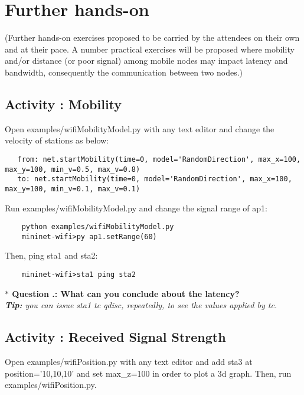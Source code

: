 \section{Further hands-on}
(Further hands-on exercises proposed to be carried by the attendees on their own and at their pace.
	A number practical exercises will be proposed where mobility and/or distance (or poor signal) among mobile nodes may impact latency and bandwidth, consequently the communication between two nodes.)


\setcounter{question}{1}
\subsection{Activity \themycounter{}: Mobility}  


\noindent Open examples/wifiMobilityModel.py with any text editor and change the velocity of stations as below:
\begin{verbatim}
   from: net.startMobility(time=0, model='RandomDirection', max_x=100, max_y=100, min_v=0.5, max_v=0.8)
   to: net.startMobility(time=0, model='RandomDirection', max_x=100, max_y=100, min_v=0.1, max_v=0.1)
\end{verbatim}

\noindent Run examples/wifiMobilityModel.py and change the signal range of ap1:
\begin{verbatim}
    python examples/wifiMobilityModel.py
    mininet-wifi>py ap1.setRange(60)
\end{verbatim}

\noindent Then, ping sta1 and sta2:
\begin{verbatim}
    mininet-wifi>sta1 ping sta2
\end{verbatim}

\noindent \textbf{$\ast$ Question \themycounter.\thequestion{}: What can you conclude about the latency?}\\
\textit{\textbf{Tip:} you can issue sta1 tc qdisc, repeatedly, to see the values applied by tc.}


\setcounter{question}{1}
\subsection{Activity \themycounter{}: Received Signal Strength} 

\noindent Open examples/wifiPosition.py with any text editor and add sta3 at position='10,10,10' and set max\_z=100 in order to plot a 3d graph. Then, run examples/wifiPosition.py.\\


